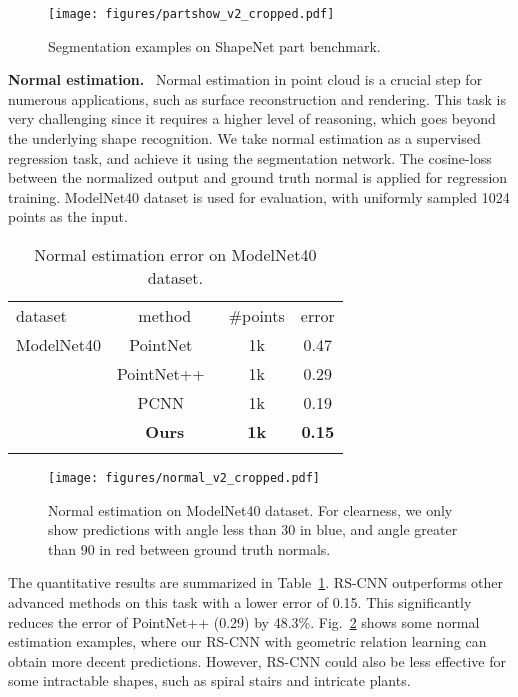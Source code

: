 \documentclass[10pt,twocolumn,letterpaper]{article}
\begin{document}
\begin{figure}[t]
\centerline{\texttt{[image: figures/partshow\_v2\_cropped.pdf]}}
\caption{Segmentation examples on ShapeNet part benchmark.}
\label{fig6:part_show}
\vspace{-10pt}
\end{figure}

\vspace{6pt}
\noindent \textbf{Normal estimation.}\,\,~Normal estimation in point cloud is a crucial step for numerous applications, such as surface reconstruction and rendering. This task is very challenging since it requires a higher level of reasoning, which goes beyond the underlying shape recognition. We take normal estimation as a supervised regression task, and achieve it using the segmentation network. The cosine-loss between the normalized output and ground truth normal is applied for regression training. ModelNet40 dataset is used for evaluation, with uniformly sampled 1024 points as the input.

\begin{table}[t]
  \centering
\caption{Normal estimation error on ModelNet40 dataset.}
\begin{tabular}{l|ccc}
  \Xhline{0.8pt}
  dataset & method & \#points & error \\
\Xhline{0.5pt}
  ModelNet40 & PointNet~\cite{c16_eocnn} & 1k & 0.47 \\
                     & PointNet++~\cite{c16_eocnn} & 1k & 0.29 \\
                     & PCNN~\cite{c16_eocnn} & 1k & 0.19 \\
                     & \textbf{Ours} & \textbf{1k} & \textbf{0.15} \\
  \Xhline{0.8pt}
  \end{tabular}
  \label{Tab3:normal}
  \vspace{-5pt}
\end{table}

\begin{figure}[t]
\centerline{\texttt{[image: figures/normal\_v2\_cropped.pdf]}}
\caption{Normal estimation on ModelNet40 dataset. For clearness, we only show predictions with angle less than 30 in \textcolor[rgb]{0.00,0.00,1.00}{blue}, and angle greater than 90 in \textcolor[rgb]{1.00,0.00,0.00}{red} between ground truth normals.}
\label{fig7:normal_show}
\vspace{-5pt}
\end{figure}

The quantitative results are summarized in Table~\ref{Tab3:normal}. RS-CNN outperforms other advanced methods on this task with a lower error of 0.15. This significantly reduces the error of PointNet++ (0.29) by 48.3\%. Fig.~\ref{fig7:normal_show} shows some normal estimation examples, where our RS-CNN with geometric relation learning can obtain more decent predictions. However, RS-CNN could also be less effective for some intractable shapes, such as spiral stairs and intricate plants.
\end{document}
